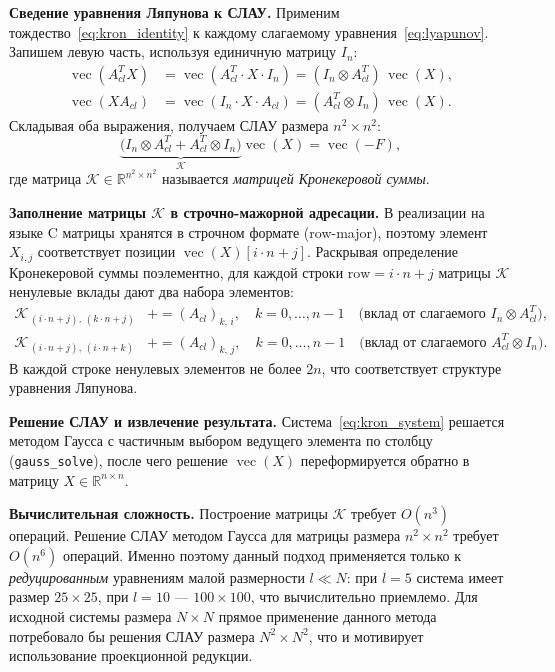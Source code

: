 \documentclass[12pt, a4paper, oneside]{extarticle}
\begin{document}
\textbf{Сведение уравнения Ляпунова к СЛАУ.} Применим
тождество~\eqref{eq:kron_identity} к каждому слагаемому
уравнения~\eqref{eq:lyapunov}. Запишем левую часть, используя единичную матрицу
$I_n$:
\begin{align*}
    \operatorname{vec}(A_{cl}^T X)
        &= \operatorname{vec}(A_{cl}^T \cdot X \cdot I_n)
         = (I_n \otimes A_{cl}^T)\,\operatorname{vec}(X), \\
    \operatorname{vec}(X A_{cl})
        &= \operatorname{vec}(I_n \cdot X \cdot A_{cl})
         = (A_{cl}^T \otimes I_n)\,\operatorname{vec}(X).
\end{align*}
Складывая оба выражения, получаем СЛАУ размера $n^2 \times n^2$:
\begin{equation}
    \underbrace{\bigl(I_n \otimes A_{cl}^T + A_{cl}^T \otimes I_n\bigr)}_{\mathcal{K}}
    \operatorname{vec}(X)
    = \operatorname{vec}(-F),
    \label{eq:kron_system}
\end{equation}
где матрица $\mathcal{K} \in \mathbb{R}^{n^2 \times n^2}$ называется
\textit{матрицей Кронекеровой суммы}.

\textbf{Заполнение матрицы $\mathcal{K}$ в строчно-мажорной адресации.}
В реализации на языке C матрицы хранятся в строчном формате (row-major), поэтому
элемент $X_{i,j}$ соответствует позиции $\operatorname{vec}(X)[i \cdot n + j]$.
Раскрывая определение Кронекеровой суммы поэлементно, для каждой строки
$\text{row} = i \cdot n + j$ матрицы $\mathcal{K}$ ненулевые вклады дают два
набора элементов:
\begin{align*}
    \mathcal{K}_{\,(i \cdot n + j),\,(k \cdot n + j)}
        &\mathrel{+}= (A_{cl})_{k,\,i}, \quad k = 0,\dots,n-1
        \quad\text{(вклад от слагаемого $I_n \otimes A_{cl}^T$),} \\
    \mathcal{K}_{\,(i \cdot n + j),\,(i \cdot n + k)}
        &\mathrel{+}= (A_{cl})_{k,\,j}, \quad k = 0,\dots,n-1
        \quad\text{(вклад от слагаемого $A_{cl}^T \otimes I_n$).}
\end{align*}
В каждой строке ненулевых элементов не более $2n$, что соответствует структуре
уравнения Ляпунова.

\textbf{Решение СЛАУ и извлечение результата.} Система~\eqref{eq:kron_system}
решается методом Гаусса с частичным выбором ведущего элемента по столбцу
(\texttt{gauss\_solve}), после чего решение $\operatorname{vec}(X)$ переформируется
обратно в матрицу $X \in \mathbb{R}^{n \times n}$.

\textbf{Вычислительная сложность.} Построение матрицы $\mathcal{K}$ требует
$O(n^3)$ операций. Решение СЛАУ методом Гаусса для матрицы размера
$n^2 \times n^2$ требует $O(n^6)$ операций. Именно поэтому данный подход
применяется только к \textit{редуцированным} уравнениям малой размерности
$l \ll N$: при $l = 5$ система имеет размер $25 \times 25$, при $l = 10$ ---
$100 \times 100$, что вычислительно приемлемо. Для исходной системы размера
$N \times N$ прямое применение данного метода потребовало бы решения СЛАУ
размера $N^2 \times N^2$, что и мотивирует использование проекционной редукции.
\end{document}
